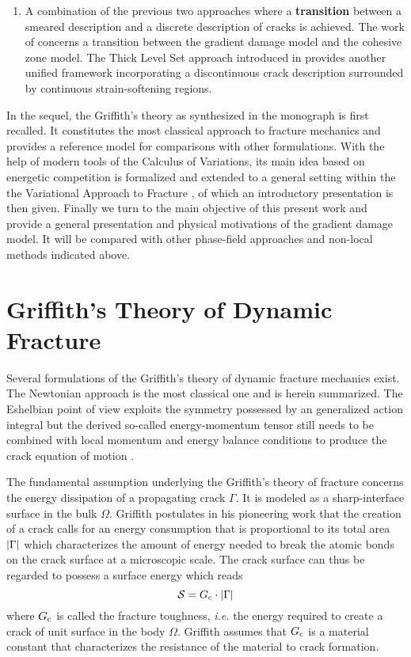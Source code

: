 \begin{enumerate}
\item A combination of the previous two approaches where a \textbf{transition} between a smeared description and a discrete description of cracks is achieved. The work of \cite{CuvilliezFeyelLorentzMichel-Ponnelle:2012} concerns a transition between the gradient damage model and the cohesive zone model. The Thick Level Set approach introduced in \cite{MoesStolzBernardChevaugeon:2011,MoreauMoesPicartStainier:2015} provides another unified framework incorporating a discontinuous crack description surrounded by continuous strain-softening regions.
\end{enumerate}

In the sequel, the Griffith's theory as synthesized in the monograph \cite{Freund:1990} is first recalled. It constitutes the most classical approach to fracture mechanics and provides a reference model for comparisons with other formulations. With the help of modern tools of the Calculus of Variations, its main idea based on energetic competition is formalized and extended to a general setting within the the Variational Approach to Fracture \cite{BourdinFrancfortMarigo:2008}, of which an introductory presentation is then given. Finally we turn to the main objective of this present work and provide a general presentation and physical motivations of the gradient damage model. It will be compared with other phase-field approaches and non-local methods indicated above. 

\section{Griffith's Theory of Dynamic Fracture}
Several formulations of the Griffith's theory of dynamic fracture mechanics exist. The Newtonian approach \cite{Freund:1990} is the most classical one and is herein summarized. The Eshelbian point of view \cite{Eshelby:1951} exploits the symmetry possessed by an generalized action integral but the derived so-called energy-momentum tensor still needs to be combined with local momentum and energy balance conditions to produce the crack equation of motion \cite{Maugin:1994,Adda-BediaAriasAmarLund:1999}.

The fundamental assumption underlying the Griffith's theory of fracture concerns the energy dissipation of a propagating crack $\Gamma$. It is modeled as a sharp-interface surface in the bulk $\Omega$. Griffith postulates in his pioneering work \cite{Griffith:1921} that the creation of a crack calls for an energy consumption that is proportional to its total area $\left\lvert{\Gamma}\right\rvert$ which characterizes the amount of energy needed to break the atomic bonds on the crack surface at a microscopic scale. The crack surface can thus be regarded to possess a surface energy which reads
\begin{equation} \label{eq:StGriffith}
\mathcal{S}=G_\mathrm{c}\cdot\left\lvert{\Gamma}\right\rvert
\end{equation}
where $G_\mathrm{c}$ is called the fracture toughness, \emph{i.e.} the energy required to create a crack of unit surface in the body $\Omega$. Griffith assumes that $G_\mathrm{c}$ is a material constant that characterizes the resistance of the material to crack formation.

